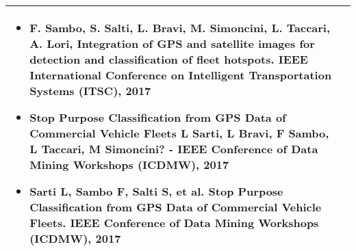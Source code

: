 \begin{center}
\begin{tabular}{|p{}|p{}|}
{\begin{itemize}
\item F. Sambo, S. Salti, L. Bravi, M. Simoncini, L. Taccari, A. Lori, Integration of GPS and satellite images for detection and classification of fleet hotspots. IEEE International Conference on Intelligent Transportation Systems (ITSC), 2017

\item Stop Purpose Classification from GPS Data of Commercial Vehicle Fleets
L Sarti, L Bravi, F Sambo, L Taccari, M Simoncini? - IEEE Conference of Data Mining Workshops (ICDMW), 2017

\item Sarti  L, Sambo F, Salti S, et al.  Stop Purpose Classification from GPS Data of Commercial Vehicle Fleets.  IEEE Conference of Data Mining Workshops (ICDMW), 2017

%
\end{itemize}}\tabularnewline\bottomrule

\end{tabular}
\end{center}
